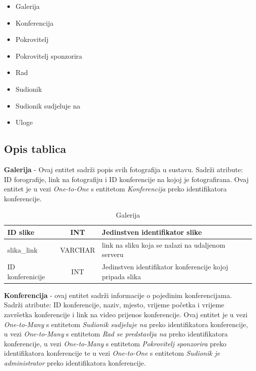 \begin{itemize}
	\item Galerija
	\item Konferencija
	\item Pokrovitelj
	\item Pokrovitelj sponzorira
	\item Rad
	\item Sudionik
	\item Sudionik sudjeluje na
	\item Uloge
\end{itemize}
		
			\subsection{Opis tablica}

\textbf{Galerija} - Ovaj entitet sadrži popis svih fotografija u sustavu. Sadrži atribute: ID forografije, link na fotografiju i ID konferencije na kojoj je fotografirana. Ovaj entitet je u vezi \textit{One-to-One} s entitetom \textit{Konferencija} preko identifikatora konferencije.

\begin{table}[H]
	\caption{Galerija}
	\label{tbl:galerija}
	\centering
	\begin{tabular}{|l|c|l|} 
		\hline
		\cellcolor{lightgreen}ID slike & INT & Jedinstven identifikator slike\\ 
		\hline
		slika_link & VARCHAR & link na sliku koja se nalazi na udaljenom serveru\\ 
		\hline
		\cellcolor{lightblue}ID konferenicije & INT & Jedinstven identifikator konferencije kojoj pripada slika\\ 
		\hline
	\end{tabular}
\end{table}

\textbf{Konferencija} - ovaj entitet sadrži informacije o pojedinim konferencijama. Sadrži atribute: ID konferencije, naziv, mjesto, vrijeme početka i vrijeme završetka konferencije i link na video prijenos konferencije. Ovaj entitet je u vezi \textit{One-to-Many} s entitetom \textit{Sudionik sudjeluje na} preko identifikatora konferencije, u vezi \textit{One-to-Many} s entitetom \textit{Rad se predstavlja na} preko identifikatora konferencije, u vezi \textit{One-to-Many} s entitetom \textit{Pokrovitelj sponzorira} preko identifikatora konferencije te u vezi \textit{One-to-One} s entitetom \textit{Sudionik je administrator} preko identifikatora konferencije.

